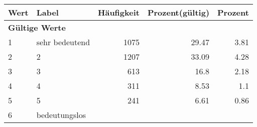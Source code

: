      \begin{longtable}{lXrrr}
     \toprule
     \textbf{Wert} & \textbf{Label} & \textbf{Häufigkeit} & \textbf{Prozent(gültig)} & \textbf{Prozent} \\
     \endhead
     \midrule
     \multicolumn{5}{l}{\textbf{Gültige Werte}}\\

     1 &
     \multicolumn{1}{X}{ sehr bedeutend   } &


       \num{1075} &
       \num[round-mode=places,round-precision=2]{29.47} &
         \num[round-mode=places,round-precision=2]{3.81} \\

     2 &
     \multicolumn{1}{X}{ 2   } &


       \num{1207} &
       \num[round-mode=places,round-precision=2]{33.09} &
         \num[round-mode=places,round-precision=2]{4.28} \\

     3 &
     \multicolumn{1}{X}{ 3   } &


       \num{613} &
       \num[round-mode=places,round-precision=2]{16.8} &
         \num[round-mode=places,round-precision=2]{2.18} \\

     4 &
     \multicolumn{1}{X}{ 4   } &


       \num{311} &
       \num[round-mode=places,round-precision=2]{8.53} &
         \num[round-mode=places,round-precision=2]{1.1} \\

     5 &
     \multicolumn{1}{X}{ 5   } &


       \num{241} &
       \num[round-mode=places,round-precision=2]{6.61} &
         \num[round-mode=places,round-precision=2]{0.86} \\

     6 &
     \multicolumn{1}{X}{ bedeutungslos   } &



\end{longtable}
